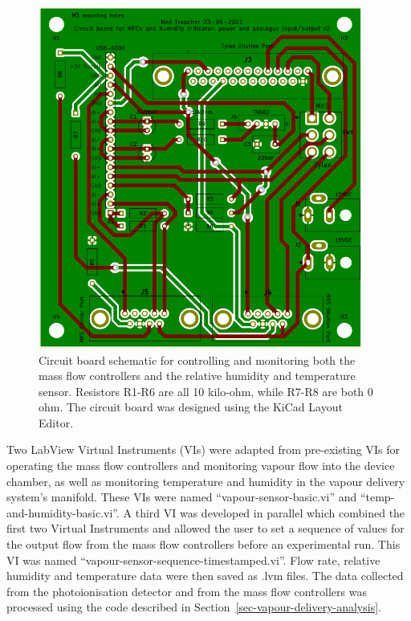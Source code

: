 \documentclass[
  a4paper,
]{scrbook}
\begin{document}
\begin{figure}

{\centering \includegraphics[width=0.95\textwidth,height=\textheight]{figures/ch8/current_PCB.png}

}

\caption[Circuit board schematic for controlling and monitoring both the
mass flow controllers and the relative humidity and temperature
sensor.]{\label{fig-current-pcb-design}Circuit board schematic for
controlling and monitoring both the mass flow controllers and the
relative humidity and temperature sensor. Resistors R1-R6 are all 10
kilo-ohm, while R7-R8 are both 0 ohm. The circuit board was designed
using the KiCad Layout Editor.}

\end{figure}

Two LabView Virtual Instruments (VIs) were adapted from pre-existing VIs
for operating the mass flow controllers and monitoring vapour flow into
the device chamber, as well as monitoring temperature and humidity in
the vapour delivery system's manifold. These VIs were named
``vapour-sensor-basic.vi'' and ``temp-and-humidity-basic.vi''. A third
VI was developed in parallel which combined the first two Virtual
Instruments and allowed the user to set a sequence of values for the
output flow from the mass flow controllers before an experimental run.
This VI was named ``vapour-sensor-sequence-timestamped.vi''. Flow rate,
relative humidity and temperature data were then saved as .lvm files.
The data collected from the photoionisation detector and from the mass
flow controllers was processed using the code described in
Section~\ref{sec-vapour-delivery-analysis}.
\end{document}

